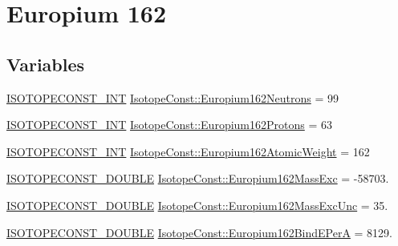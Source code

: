 \hypertarget{group___isotope_const-_europium-_eu162}{}\section{Europium 162}
\label{group___isotope_const-_europium-_eu162}
\subsection*{Variables}
\begin{DoxyCompactItemize}
\item 
\mbox{\hyperlink{group___isotope_const-_macros_ga5f18360b3e99483a35c32d789e62621c}{I\+S\+O\+T\+O\+P\+E\+C\+O\+N\+S\+T\+\_\+\+I\+NT}} \mbox{\hyperlink{group___isotope_const-_europium-_eu162_ga102b45137c17dca3254bf3e44b9a81f0}{Isotope\+Const\+::\+Europium162\+Neutrons}} = 99
\item 
\mbox{\hyperlink{group___isotope_const-_macros_ga5f18360b3e99483a35c32d789e62621c}{I\+S\+O\+T\+O\+P\+E\+C\+O\+N\+S\+T\+\_\+\+I\+NT}} \mbox{\hyperlink{group___isotope_const-_europium-_eu162_ga18951c5efe7cf8d81da581a1f300601d}{Isotope\+Const\+::\+Europium162\+Protons}} = 63
\item 
\mbox{\hyperlink{group___isotope_const-_macros_ga5f18360b3e99483a35c32d789e62621c}{I\+S\+O\+T\+O\+P\+E\+C\+O\+N\+S\+T\+\_\+\+I\+NT}} \mbox{\hyperlink{group___isotope_const-_europium-_eu162_ga4ea2ca4a2f684bc5949b1722fd14c9c6}{Isotope\+Const\+::\+Europium162\+Atomic\+Weight}} = 162
\item 
\mbox{\hyperlink{group___isotope_const-_macros_ga8f45a7272ce02c0b4c65c44636ed719a}{I\+S\+O\+T\+O\+P\+E\+C\+O\+N\+S\+T\+\_\+\+D\+O\+U\+B\+LE}} \mbox{\hyperlink{group___isotope_const-_europium-_eu162_ga580050269b891c72ea4e86b1791d86a1}{Isotope\+Const\+::\+Europium162\+Mass\+Exc}} = -\/58703.
\item 
\mbox{\hyperlink{group___isotope_const-_macros_ga8f45a7272ce02c0b4c65c44636ed719a}{I\+S\+O\+T\+O\+P\+E\+C\+O\+N\+S\+T\+\_\+\+D\+O\+U\+B\+LE}} \mbox{\hyperlink{group___isotope_const-_europium-_eu162_gaa94c6431714c68de40cc577492af9cbd}{Isotope\+Const\+::\+Europium162\+Mass\+Exc\+Unc}} = 35.
\item 
\mbox{\hyperlink{group___isotope_const-_macros_ga8f45a7272ce02c0b4c65c44636ed719a}{I\+S\+O\+T\+O\+P\+E\+C\+O\+N\+S\+T\+\_\+\+D\+O\+U\+B\+LE}} \mbox{\hyperlink{group___isotope_const-_europium-_eu162_gad3cfda9dfd84526bed6491fe5d54866d}{Isotope\+Const\+::\+Europium162\+Bind\+E\+PerA}} = 8129.
\item 

\end{DoxyCompactItemize}
